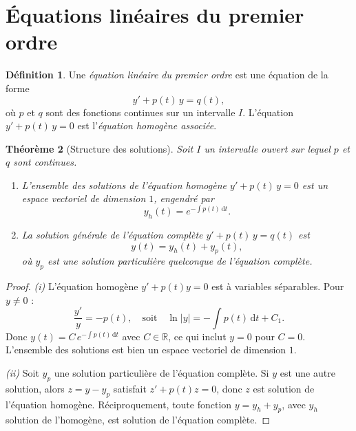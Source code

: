 \documentclass[12pt,a4paper,openany]{book}
\theoremstyle{definition}
\newtheorem{definition}{Définition}[chapter]
\theoremstyle{plain}
\newtheorem{theoreme}[definition]{Théorème}
\theoremstyle{remark}
\newcommand{\R}{\mathbb{R}}
\newcommand{\dd}{\mathrm{d}}
\newcommand{\abs}[1]{\left|#1\right|}
\begin{document}
\section{Équations linéaires du premier ordre}
\label{sec:lineaires-premier-ordre}

\begin{definition}
\label{def:lineaire-1}
Une \emph{équation linéaire du premier ordre} est une équation de la forme
\begin{equation}
\label{eq:lineaire-1}
y' + p(t)\,y = q(t),
\end{equation}
où $p$ et $q$ sont des fonctions continues sur un intervalle $I$. L'équation $y' + p(t)\,y = 0$ est l'\emph{équation homogène associée}.
\end{definition}

\begin{theoreme}[Structure des solutions]
\label{thm:structure-lineaire-1}
Soit $I$ un intervalle ouvert sur lequel $p$ et $q$ sont continues.
\begin{enumerate}[label=(\roman*)]
\item L'ensemble des solutions de l'équation homogène $y' + p(t)\,y = 0$ est un espace vectoriel de dimension $1$, engendré par
\[
y_h(t) = e^{-\int p(t)\,\dd t}.
\]
\item La solution générale de l'équation complète $y' + p(t)\,y = q(t)$ est
\[
y(t) = y_h(t) + y_p(t),
\]
où $y_p$ est une solution particulière quelconque de l'équation complète.
\end{enumerate}
\end{theoreme}

\begin{proof}
\textit{(i)} L'équation homogène $y' + p(t)y = 0$ est à variables séparables. Pour $y \neq 0$ :
\[
\frac{y'}{y} = -p(t), \quad \text{soit} \quad \ln\abs{y} = -\int p(t)\,\dd t + C_1.
\]
Donc $y(t) = C\,e^{-\int p(t)\,\dd t}$ avec $C \in \R$, ce qui inclut $y = 0$ pour $C = 0$. L'ensemble des solutions est bien un espace vectoriel de dimension $1$.

\textit{(ii)} Soit $y_p$ une solution particulière de l'équation complète. Si $y$ est une autre solution, alors $z = y - y_p$ satisfait $z' + p(t)z = 0$, donc $z$ est solution de l'équation homogène. Réciproquement, toute fonction $y = y_h + y_p$, avec $y_h$ solution de l'homogène, est solution de l'équation complète.
\end{proof}
\end{document}
